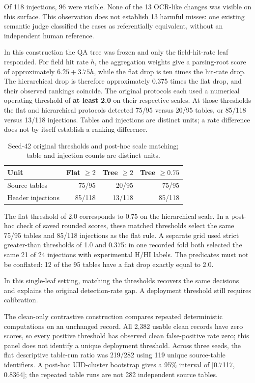 \documentclass[conference]{IEEEtran}
\begin{document}
Of 118 injections, 96 were visible. None of the 13 OCR-like changes was
visible on this surface. This observation does not establish 13 harmful
misses: one existing semantic judge classified the cases as
referentially equivalent, without an independent human reference.

In this construction the QA tree was frozen and only the field-hit-rate
leaf responded. For field hit rate \(h\), the aggregation weights give a
parsing-root score of approximately \(6.25 + 3.75h\), while the flat
drop is ten times the hit-rate drop. The hierarchical drop is therefore
approximately 0.375 times the flat drop, and their observed rankings
coincide. The original protocols each used a numerical operating
threshold of \textbf{at least 2.0} on their respective scales. At those
thresholds the flat and hierarchical protocols detected 75/95 versus
20/95 tables, or 85/118 versus 13/118 injections. Tables and injections
are distinct units; a rate difference does not by itself establish a
ranking difference.

\begin{table}[htbp]
\caption{Seed-42 original thresholds and post-hoc scale matching; table and injection counts are distinct units.}
\label{tab:original-detection}
\centering
\setlength{\tabcolsep}{4pt}
\begin{tabular}{lrrr}
\hline
Unit & Flat $\ge 2$ & Tree $\ge 2$ & Tree $\ge 0.75$ \\
\hline
Source tables & 75/95 & 20/95 & 75/95 \\
Header injections & 85/118 & 13/118 & 85/118 \\
\hline
\end{tabular}
\end{table}

The flat threshold of 2.0 corresponds to 0.75 on the hierarchical scale.
In a post-hoc check of saved rounded scores, these matched thresholds
select the same 75/95 tables and 85/118 injections as the flat rule. A
separate grid used strict greater-than thresholds of 1.0 and 0.375: in
one recorded fold both selected the same 21 of 24 injections with
experimental H/HI labels. The predicates must not be conflated: 12 of
the 95 tables have a flat drop exactly equal to 2.0.

In this single-leaf setting, matching the thresholds recovers the same
decisions and explains the original detection-rate gap. A deployment
threshold still requires calibration.

The clean-only contrastive construction compares repeated deterministic
computations on an unchanged record. All 2,382 usable clean records have
zero scores, so every positive threshold has observed clean
false-positive rate zero; this panel does not identify a unique
deployment threshold. Across three seeds, the flat descriptive table-run
ratio was 219/282 using 119 unique source-table identifiers. A post-hoc
UID-cluster bootstrap gives a 95\% interval of {[}0.7117, 0.8364{]}; the
repeated table runs are not 282 independent source tables.
\end{document}
